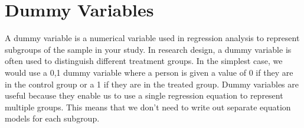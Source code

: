 \documentclass[MASTER.tex]{subfiles}
\begin{document}
\newpage
\section{Dummy Variables}
A dummy variable is a numerical variable used in regression analysis to represent subgroups of the sample in your study. In research design, a dummy variable is often used to distinguish different treatment groups. In the simplest case, we would use a 0,1 dummy variable where a person is given a value of 0 if they are in the control group or a 1 if they are in the treated group. Dummy variables are useful because they enable us to use a single regression equation to represent multiple groups. This means that we don't need to write out separate equation models for each subgroup.
\end{document}
